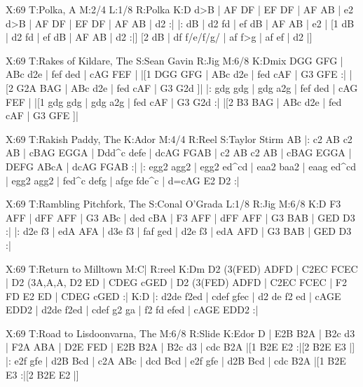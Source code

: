 \documentclass[letterpaper]{article}
\begin{document}
\begin{abc}[name]
X:69
T:Polka, A
M:2/4
L:1/8
R:Polka
K:D
d>B | AF DF | EF DF | AF AB | e2 d>B |
AF DF | EF DF | AF AB | d2 :|
|: dB | d2 fd | ef dB | AF AB | e2 |
[1 dB | d2 fd | ef dB | AF AB | d2 :|]
[2 dB | df f/e/f/g/ | af f>g | af ef | d2 |]
\end{abc}

\begin{abc}[name]
X:69
T:Rakes of Kildare, The
S:Sean Gavin
R:Jig
M:6/8
K:Dmix
DGG GFG | ABc d2e | fef ded | cAG FEF |
|[1 DGG GFG | ABc d2e | fed cAF | G3 GFE :|
|[2 G2A BAG | ABc d2e | fed cAF | G3 G2d ]|
|: gdg gdg | gdg a2g | fef ded | cAG FEF |
|[1 gdg gdg | gdg a2g | fed cAF | G3 G2d :|
|[2 B3 BAG | ABc d2e | fed cAF | G3 GFE ]|

\end{abc}

\begin{abc}[name]
X:69
T:Rakish Paddy, The
K:Ador
M:4/4
R:Reel
S:Taylor Stirm
AB |: c2 AB c2 AB | cBAG EGGA | Ddd^c defe | dcAG FGAB |
c2 AB c2 AB | cBAG EGGA | DEFG ABcA | dcAG FGAB :|
|: egg2 agg2 | egg2 ed^cd | eaa2 baa2 | eaag ed^cd |
egg2 agg2 | fed^c defg | afge fde^c | d=cAG E2 D2 :|
\end{abc}

\begin{abc}[name]
X:69
T:Rambling Pitchfork, The
S:Conal O'Grada
L:1/8
R:Jig
M:6/8
K:D
F3 AFF | dFF AFF | G3 ABc | ded cBA |
F3 AFF | dFF AFF | G3 BAB | GED D3 :|
|: d2e f3 | edA AFA | d3e f3 | faf ged |
d2e f3 | edA AFD | G3 BAB | GED D3 :|
\end{abc}

\begin{abc}[name]
X:69
T:Return to Milltown
M:C|
R:reel
K:Dm
D2 (3(FED) ADFD | C2EC FCEC | D2 (3A,A,A, D2 ED | CDEG cGED |
D2 (3(FED) ADFD | C2EC FCEC | F2 FD E2 ED | CDEG cGED :|
K:D
|: d2de f2ed | cdef gfec | d2 de f2 ed | cAGE EDD2 |
d2de f2ed | cdef g2 ga | f2 fd efed | cAGE EDD2 :|
\end{abc}

\begin{abc}[name]
X:69
T:Road to Lisdoonvarna, The
M:6/8
R:Slide
K:Edor
D | E2B B2A | B2c d3 | F2A ABA | D2E FED |
E2B B2A | B2c d3 | cdc B2A |[1 B2E E2 :|[2 B2E E3 |]
|: e2f gfe | d2B Bcd | c2A ABc | dcd Bcd |
e2f gfe | d2B Bcd | cdc B2A |[1 B2E E3 :|[2 B2E E2 |]
\end{abc}
\end{document}
